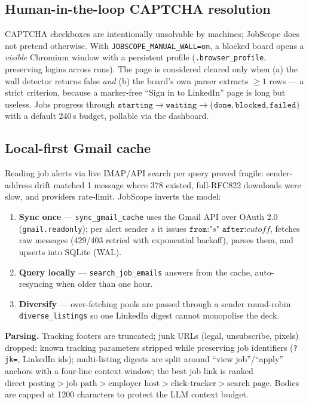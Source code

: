 \documentclass[11pt,a4paper]{article}
\newcommand{\code}[1]{\texttt{#1}}
\begin{document}
\subsection{Human-in-the-loop CAPTCHA resolution}
\label{sec:manual}

CAPTCHA checkboxes are intentionally unsolvable by machines; JobScope does
not pretend otherwise. With \code{JOBSCOPE\_MANUAL\_WALL=on}, a blocked
board opens a \emph{visible} Chromium window with a persistent profile
(\code{.browser\_profile}, preserving logins across runs). The page is
considered cleared only when (a) the wall detector returns false
\emph{and} (b) the board's own parser extracts $\geq 1$ rows --- a strict
criterion, because a marker-free ``Sign in to LinkedIn'' page is long but
useless. Jobs progress through
$\texttt{starting} \rightarrow \texttt{waiting} \rightarrow
\{\texttt{done}, \texttt{blocked}, \texttt{failed}\}$ with a default
240\,s budget, pollable via the dashboard.

\subsection{Local-first Gmail cache}
\label{sec:mailcache}

Reading job alerts via live IMAP/API search per query proved fragile:
sender-address drift matched 1 message where 378 existed, full-RFC822
downloads were slow, and providers rate-limit. JobScope inverts the model:

\begin{enumerate}[leftmargin=2.2em]
  \item \textbf{Sync once} --- \code{sync\_gmail\_cache} uses the Gmail API
        over OAuth 2.0 (\code{gmail.readonly}); per alert sender
        $s$ it issues
        $\texttt{from:"}s\texttt{" after:}\textit{cutoff}$, fetches raw
        messages (429/403 retried with exponential backoff), parses them,
        and upserts into SQLite (WAL).
  \item \textbf{Query locally} --- \code{search\_job\_emails} answers from
        the cache, auto-resyncing when older than one hour.
  \item \textbf{Diversify} --- over-fetching pools are passed through a
        sender round-robin \code{diverse\_listings} so one LinkedIn digest
        cannot monopolise the deck.
\end{enumerate}

\textbf{Parsing.} Tracking footers are truncated; junk URLs (legal,
unsubscribe, pixels) dropped; known tracking parameters stripped while
preserving job identifiers (\code{?jk=}, LinkedIn ids); multi-listing
digests are split around ``view job''/``apply'' anchors with a four-line
context window; the best job link is ranked
$\text{direct posting} > \text{job path} > \text{employer host} >
\text{click-tracker} > \text{search page}$. Bodies are capped at 1200
characters to protect the LLM context budget.
\end{document}
